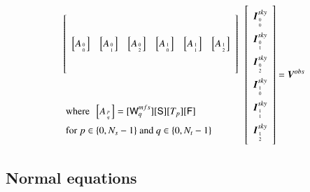 \documentclass[structabstract]{stylefiles/aa}
\newcommand{\F}{{\tens{F}}}
\newcommand{\Sa}{{\tens{S}}}
\newcommand{\W}{{\tens{W}}}
\begin{document}
{
\begin{equation}
\begin{array}{l}
\left[\begin{array}{llllll} 
\noalign{\medskip}
\noalign{\medskip}
\noalign{\medskip}
\noalign{\medskip}
   \left[A_{{0}\atop{0}}\right] & \left[ A_{{0}\atop{1}} \right] & \left[A_{{0}\atop{2}}\right] & 
   \left[A_{{1}\atop{0}}\right] & \left[A_{{1}\atop{1}}\right] & \left[A_{{1}\atop{2}}\right] \\  
\noalign{\medskip}
\noalign{\medskip}
\noalign{\medskip}
\noalign{\medskip}
   \end{array} \right] \\
\noalign{\medskip}
\noalign{\medskip}
\noalign{\medskip}
\noalign{\medskip}
\noalign{\medskip}
{~\mathrm{where}~~\left[ A_{{p}\atop{q}}\right] = [\W^{mfs}_q][\Sa][T_p][\F]} \\
\noalign{\medskip}
{~\mathrm{for}~p\in\{0,N_s-1\}~\mathrm{and}~q\in\{0,N_t-1\}    }  
\end{array}
\left[\begin{array}{l} 
\noalign{\medskip}
                       \vec{I}^{sky}_{{0}\atop{0}} \\ 
\noalign{\medskip}
                       \vec{I}^{sky}_{{0}\atop{1}} \\ 
\noalign{\medskip}
                       \vec{I}^{sky}_{{0}\atop{2}} \\ 
\noalign{\medskip}
                       \vec{I}^{sky}_{{1}\atop{0}} \\ 
\noalign{\medskip}
                       \vec{I}^{sky}_{{1}\atop{1}} \\ 
\noalign{\medskip}
                       \vec{I}^{sky}_{{1}\atop{2}}\\
\noalign{\medskip}
		       \end{array}\right] =\vec{V}^{obs}%
\label{meqn_msmfs_math}
\end{equation}
}



\subsection{Normal equations}\label{Sec:neqn}
\end{document}
